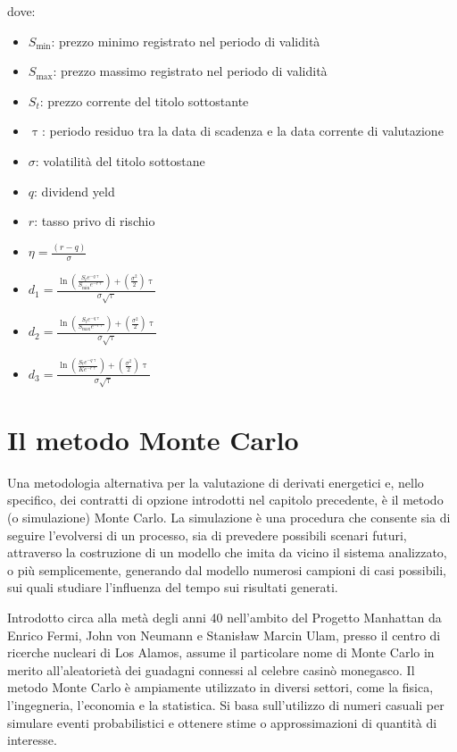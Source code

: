 \documentclass[12pt,a4paper]{report}
\begin{document}
dove:

\begin{itemize}
    \item $S_{\text{min}}$: prezzo minimo registrato nel periodo di validità
    \item $S_{\text{max}}$: prezzo massimo registrato nel periodo di validità
    \item $S_t$: prezzo corrente del titolo sottostante
    \item $\uptau$: periodo residuo tra la data di scadenza e la data corrente di valutazione
    \item $\sigma$: volatilità del titolo sottostane
    \item $q$: dividend yeld
    \item $r$: tasso privo di rischio
    \item $\eta = \frac{(r - q)}{\sigma}$
    \item $d_1 = \frac{\ln\left(\frac{S_t e^{-q\uptau}}{S_{\text{min}}e^{-r\uptau}}\right) + \left(\frac{\sigma^2}{2}\right)\uptau}{\sigma\sqrt{\uptau}}$    
    \item $d_2 = \frac{\ln\left(\frac{S_t e^{-q\uptau}}{S_{\text{max}}e^{-r\uptau}}\right) + \left(\frac{\sigma^2}{2}\right)\uptau}{\sigma\sqrt{\uptau}}$
    \item $d_3 = \frac{\ln\left(\frac{S_t e^{-q\uptau}}{K e^{-r\uptau}}\right) + \left(\frac{\sigma^2}{2}\right)\uptau}{\sigma\sqrt{\uptau}}$
\end{itemize}




\chapter{Il metodo Monte Carlo}

Una metodologia alternativa per la valutazione di derivati energetici e, nello specifico, dei contratti di opzione introdotti nel capitolo precedente, è il metodo (o simulazione) Monte Carlo. La simulazione è una procedura che consente sia di seguire l'evolversi di un processo, sia di prevedere possibili scenari futuri, attraverso la costruzione di un modello che imita da vicino il sistema analizzato, o più semplicemente, generando dal modello numerosi campioni di casi possibili, sui quali studiare l'influenza del tempo sui risultati generati.

Introdotto circa alla metà degli anni 40 nell'ambito del Progetto Manhattan da Enrico Fermi, John von Neumann e Stanisław Marcin Ulam, presso il centro di ricerche nucleari di Los Alamos, assume il particolare nome di Monte Carlo in merito all'aleatorietà dei guadagni connessi al celebre casinò monegasco. Il metodo Monte Carlo è ampiamente utilizzato in diversi settori, come la fisica, l'ingegneria, l'economia e la statistica. Si basa sull'utilizzo di numeri casuali per simulare eventi probabilistici e ottenere stime o approssimazioni di quantità di interesse. 
\end{document}
